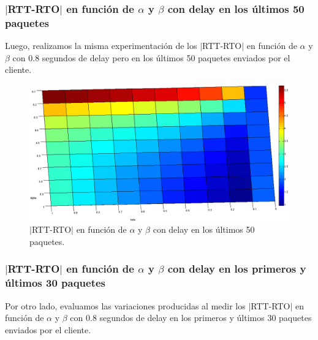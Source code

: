 \documentclass[10pt, a4paper]{article}
\begin{document}
\subsubsection{$|$RTT-RTO$|$ en función de $\alpha$ y $\beta$ con delay en los últimos 50 paquetes}
Luego, realizamos la misma experimentación de los $|$RTT-RTO$|$ en función de $\alpha$ y $\beta$ con 0.8 segundos de delay pero en los últimos 50 paquetes enviados por el cliente.


\begin{figure}[H]
\begin{center}
\includegraphics[width=17cm]{delay-50L-costado.png}
\caption{$|$RTT-RTO$|$ en función de $\alpha$ y $\beta$ con delay en los últimos 50 paquetes.}
\end{center}
\end{figure}

\subsubsection{$|$RTT-RTO$|$ en función de $\alpha$ y $\beta$ con delay en los primeros y últimos 30 paquetes}
Por otro lado, evaluamos las variaciones producidas al medir los $|$RTT-RTO$|$ en función de $\alpha$ y $\beta$ con 0.8 segundos de delay en los primeros y últimos 30 paquetes enviados por el cliente.
\end{document}
